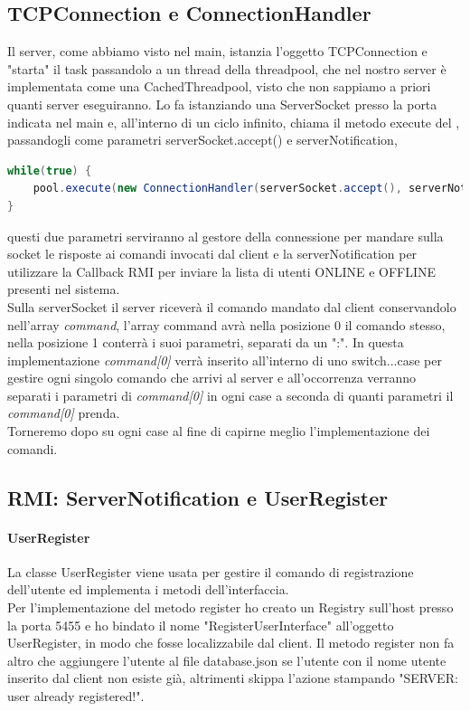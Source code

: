 \documentclass[]{article}
\begin{document}
\subsection{TCPConnection e ConnectionHandler}
Il server, come abbiamo visto nel main, istanzia l'oggetto TCPConnection e "starta" il task passandolo a un thread della threadpool, che nel nostro server è implementata come una CachedThreadpool, visto che non sappiamo a priori quanti server eseguiranno.
Lo fa istanziando una ServerSocket presso la porta indicata nel main e, all'interno di un ciclo infinito, chiama il metodo execute del , passandogli come parametri serverSocket.accept() e serverNotification,
\begin{lstlisting}[language=java]
while(true) {
	pool.execute(new ConnectionHandler(serverSocket.accept(), serverNotification));
}
\end{lstlisting}
 questi due parametri serviranno al gestore della connessione per mandare sulla socket le risposte ai comandi invocati dal client e la serverNotification per utilizzare la Callback RMI per inviare la lista di utenti ONLINE e OFFLINE presenti nel sistema.\\
Sulla serverSocket il server riceverà il comando mandato dal client conservandolo nell'array \textit{command}, l'array command avrà nella posizione 0 il comando stesso, nella posizione 1 conterrà i suoi parametri, separati da un ":".
In questa implementazione \textit{command[0]} verrà inserito all'interno di uno switch...case per gestire ogni singolo comando che arrivi al server e all'occorrenza verranno separati i parametri di \textit{command[0]} in ogni case a seconda di quanti parametri il \textit{command[0]} prenda.\\
Torneremo dopo su ogni case al fine di capirne meglio l'implementazione dei comandi.
\subsection{RMI: ServerNotification e UserRegister}
\paragraph{UserRegister} La classe UserRegister viene usata per gestire il comando di registrazione dell'utente ed implementa i metodi dell'interfaccia. \\Per l'implementazione del metodo register ho creato un Registry sull'host presso la porta 5455 e ho bindato il nome "RegisterUserInterface" all'oggetto UserRegister, in modo che fosse localizzabile dal client. Il metodo register non fa altro che aggiungere l'utente al file database.json se l'utente con il nome utente inserito dal client non esiste già, altrimenti skippa l'azione stampando "SERVER: user already registered!".
\end{document}
